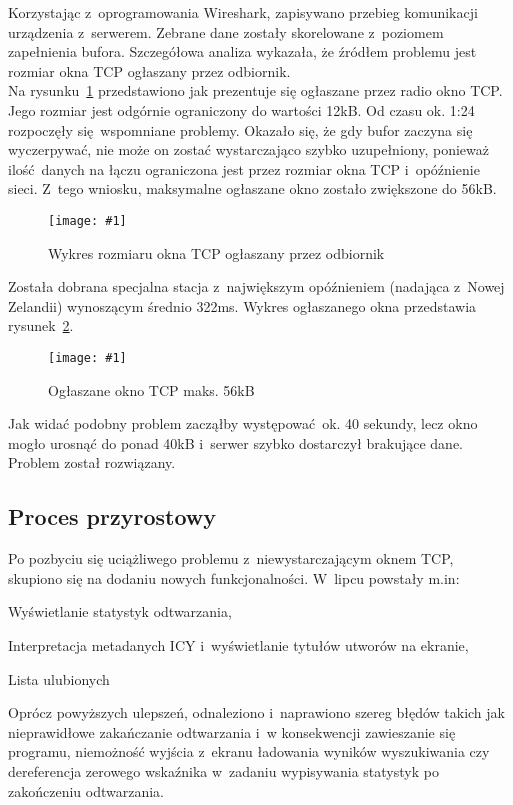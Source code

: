 \documentclass[polish]{aghengthesis}
\let\tempone\itemize
\let\temptwo\enditemize
\renewenvironment{itemize}{\tempone\setlength{\itemsep}{0cm}}{\temptwo}
\newcommand{\imgint}[4]{
	\begin{figure}[{#4}]
		\centering
		\texttt{[image: \#1]}
		\caption{#2}
		\label{#1}
	\end{figure}
}
\newcommand{\imgh}[3]{\imgint{#1}{#2}{#3}{H}}
\begin{document}
			Korzystając z~oprogramowania Wireshark\textsuperscript{\cite{wireshark}}, zapisywano przebieg komunikacji urządzenia z~serwerem.
			Zebrane dane zostały skorelowane z~poziomem zapełnienia bufora. Szczegółowa analiza wykazała, że źródłem problemu jest rozmiar okna TCP ogłaszany przez odbiornik.
			$ $\\
			
			Na rysunku~\ref{4/tcp_fail} przedstawiono jak prezentuje się ogłaszane przez radio okno TCP.
			Jego rozmiar jest odgórnie ograniczony do wartości 12kB.
			Od czasu ok. 1:24 rozpoczęły się wspomniane problemy. Okazało się, że gdy bufor zaczyna się wyczerpywać, nie może on zostać wystarczająco szybko uzupełniony, ponieważ ilość danych na łączu ograniczona jest przez rozmiar okna TCP i~opóźnienie sieci. Z~tego wniosku, maksymalne ogłaszane okno zostało zwiększone do 56kB.
			\imgh{4/tcp_fail}{Wykres rozmiaru okna TCP ogłaszany przez odbiornik}{0.85}
			
			Została dobrana specjalna stacja z~największym opóźnieniem (nadająca z~Nowej Zelandii) wynoszącym średnio 322ms. Wykres ogłaszanego okna przedstawia rysunek~\ref{4/tcp_good}.
			
			\imgh{4/tcp_good}{Ogłaszane okno TCP maks. 56kB}{0.6}

			Jak widać podobny problem zacząłby występować ok. 40 sekundy, lecz okno mogło urosnąć do ponad 40kB i~serwer szybko dostarczył brakujące dane. Problem został rozwiązany.
			
		\subsection{Proces przyrostowy}
			Po pozbyciu się uciążliwego problemu z~niewystarczającym oknem TCP, skupiono się na dodaniu nowych funkcjonalności. W~lipcu powstały m.in:
			\begin{itemize}
				\item Wyświetlanie statystyk odtwarzania,
				\item Interpretacja metadanych ICY i~wyświetlanie tytułów utworów na ekranie,
				\item Lista ulubionych
			\end{itemize}
			
			Oprócz powyższych ulepszeń, odnaleziono i~naprawiono szereg błędów takich jak nieprawidłowe zakańczanie odtwarzania i~w konsekwencji zawieszanie się programu, niemożność wyjścia z~ekranu ładowania wyników wyszukiwania czy dereferencja zerowego wskaźnika w~zadaniu wypisywania statystyk po zakończeniu odtwarzania.
			
\end{document}
